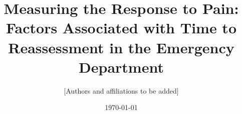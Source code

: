 \documentclass[11pt]{article}
\title{Measuring the Response to Pain: Factors Associated with Time to Reassessment in the Emergency Department}
\author{[Authors and affiliations to be added]}
\date{\today}
\begin{document}
\maketitle

\begin{abstract}

\end{abstract}

\onehalfspacing









\clearpage
\appendix

\end{document}
